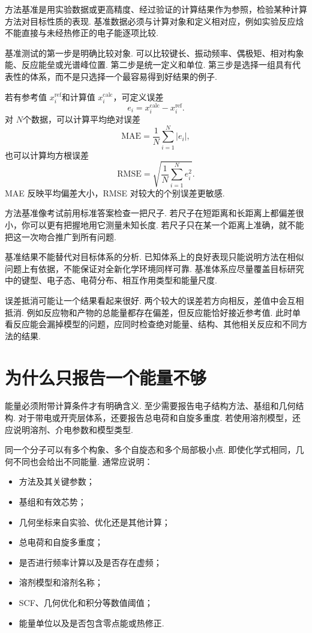 \documentclass[UTF8,11pt,a4paper,openany]{ctexbook}
\begin{document}
\begin{notationbox}
方法基准是用实验数据或更高精度、经过验证的计算结果作为参照，检验某种计算方法对目标性质的表现. 基准数据必须与计算对象和定义相对应，例如实验反应焓不能直接与未经热修正的电子能逐项比较. 
\end{notationbox}

基准测试的第一步是明确比较对象. 可以比较键长、振动频率、偶极矩、相对构象能、反应能垒或光谱峰位置. 第二步是统一定义和单位. 第三步是选择一组具有代表性的体系，而不是只选择一个最容易得到好结果的例子. 

若有参考值 $x_i^{\mathrm{ref}}$和计算值 $x_i^{\mathrm{calc}}$，可定义误差
\[
e_i=x_i^{\mathrm{calc}}-x_i^{\mathrm{ref}}.
\]
对 $N$个数据，可以计算平均绝对误差
\[
\mathrm{MAE}=\frac{1}{N}\sum_{i=1}^{N}|e_i|,
\]
也可以计算均方根误差
\[
\mathrm{RMSE}
=\sqrt{\frac{1}{N}\sum_{i=1}^{N}e_i^2}.
\]
MAE 反映平均偏差大小，RMSE 对较大的个别误差更敏感. 

\begin{analogybox}
方法基准像考试前用标准答案检查一把尺子. 若尺子在短距离和长距离上都偏差很小，你可以更有把握地用它测量未知长度. 若尺子只在某一个距离上准确，就不能把这一次吻合推广到所有问题. 
\end{analogybox}

基准结果不能替代对目标体系的分析. 已知体系上的良好表现只能说明方法在相似问题上有依据，不能保证对全新化学环境同样可靠. 基准体系应尽量覆盖目标研究中的键型、电子态、电荷分布、相互作用类型和能量尺度. 

\begin{limitbox}
误差抵消可能让一个结果看起来很好. 两个较大的误差若方向相反，差值中会互相抵消. 例如反应物和产物的总能量都存在偏差，但反应能恰好接近参考值. 此时单看反应能会漏掉模型的问题，应同时检查绝对能量、结构、其他相关反应和不同方法的结果. 
\end{limitbox}

\section{为什么只报告一个能量不够}

能量必须附带计算条件才有明确含义. 至少需要报告电子结构方法、基组和几何结构. 对于带电或开壳层体系，还要报告总电荷和自旋多重度. 若使用溶剂模型，还应说明溶剂、介电参数和模型类型. 

同一个分子可以有多个构象、多个自旋态和多个局部极小点. 即使化学式相同，几何不同也会给出不同能量. 通常应说明：

\begin{itemize}
\item 方法及其关键参数；
\item 基组和有效芯势；
\item 几何坐标来自实验、优化还是其他计算；
\item 总电荷和自旋多重度；
\item 是否进行频率计算以及是否存在虚频；
\item 溶剂模型和溶剂名称；
\item SCF、几何优化和积分等数值阈值；
\item 能量单位以及是否包含零点能或热修正. 
\end{itemize}
\end{document}

